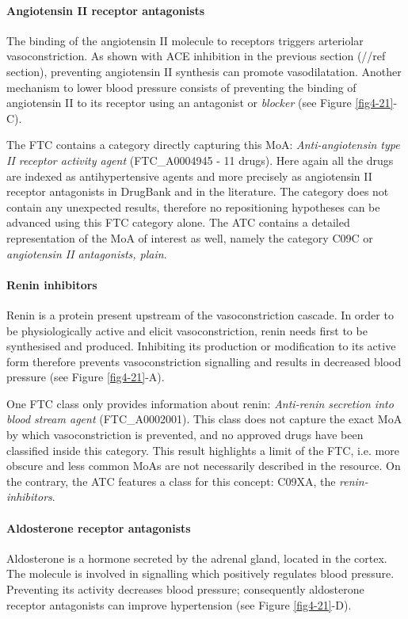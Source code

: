 \paragraph{\textbf{Angiotensin II receptor antagonists}\\}
The binding of the angiotensin II molecule to receptors triggers arteriolar vasoconstriction. As shown with ACE inhibition in the previous section (//ref section), preventing angiotensin II synthesis can promote vasodilatation. Another mechanism to lower blood pressure consists of preventing the binding of angiotensin II to its receptor using an antagonist or \emph{blocker} (see Figure \ref{fig4-21}-C).

The FTC contains a category directly capturing this MoA: \emph{Anti-angiotensin type II receptor activity agent} (FTC\_A0004945 - 11 drugs). Here again all the drugs are indexed as antihypertensive agents and more precisely as angiotensin II receptor antagonists in DrugBank and in the literature. The category does not contain any unexpected results, therefore no repositioning hypotheses can be advanced using this FTC category alone. The ATC contains a detailed representation of the MoA of interest as well, namely the category C09C or \emph{angiotensin II antagonists, plain}.

\paragraph{\textbf{Renin inhibitors}\\}
Renin is a protein present upstream of the vasoconstriction cascade. In order to be physiologically active and elicit vasoconstriction, renin needs first to be synthesised and produced. Inhibiting its production or modification to its active form therefore prevents vasoconstriction signalling and results in decreased blood pressure (see Figure \ref{fig4-21}-A).

One FTC class only provides information about renin: \emph{Anti-renin secretion into blood stream agent} (FTC\_A0002001). This class does not capture the exact MoA by which vasoconstriction is prevented, and no approved drugs have been classified inside this category. This result highlights a limit of the FTC, i.e. more obscure and less common MoAs are not necessarily described in the resource. On the contrary, the ATC features a class for this concept: C09XA, the \emph{renin-inhibitors}.

\paragraph{\textbf{Aldosterone receptor antagonists}\\}
Aldosterone is a hormone secreted by the adrenal gland, located in the cortex. The molecule is involved in signalling which positively regulates blood pressure. Preventing its activity decreases blood pressure; consequently aldosterone receptor antagonists can improve hypertension (see Figure \ref{fig4-21}-D).

